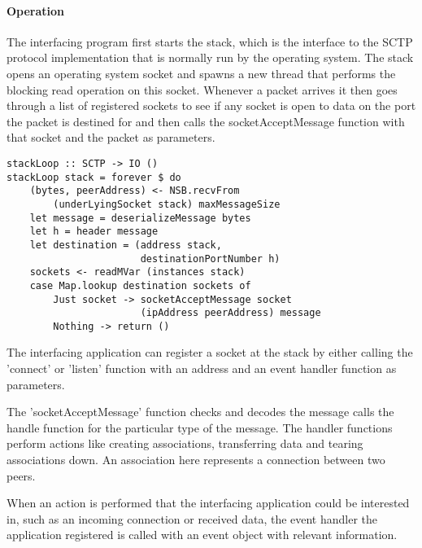 \paragraph{Operation}
The interfacing program first starts the stack, which is the interface to the SCTP protocol implementation that is normally run by the operating system. The stack opens an operating system socket and spawns a new thread that performs the blocking read operation on this socket. Whenever a packet arrives it then goes through a list of registered sockets to see if any socket is open to data on the port the packet is destined for and then calls the socketAcceptMessage function with that socket and the packet as parameters.

\begin{lstlisting}[caption={The stack loop}]
stackLoop :: SCTP -> IO ()
stackLoop stack = forever $ do
    (bytes, peerAddress) <- NSB.recvFrom 
        (underLyingSocket stack) maxMessageSize
    let message = deserializeMessage bytes
    let h = header message
    let destination = (address stack,
                       destinationPortNumber h)
    sockets <- readMVar (instances stack)
    case Map.lookup destination sockets of
        Just socket -> socketAcceptMessage socket
                       (ipAddress peerAddress) message
        Nothing -> return ()
\end{lstlisting}

The interfacing application can register a socket at the stack by either calling the 'connect' or 'listen' function with an address and an event handler function as parameters.

The 'socketAcceptMessage' function checks and decodes the message calls the handle function for the particular type of the message. The handler functions perform actions like creating associations, transferring data and tearing associations down. An association here represents a connection between two peers.

When an action is performed that the interfacing application could be interested in, such as an incoming connection or received data, the event handler the application registered is called with an event object with relevant information.

